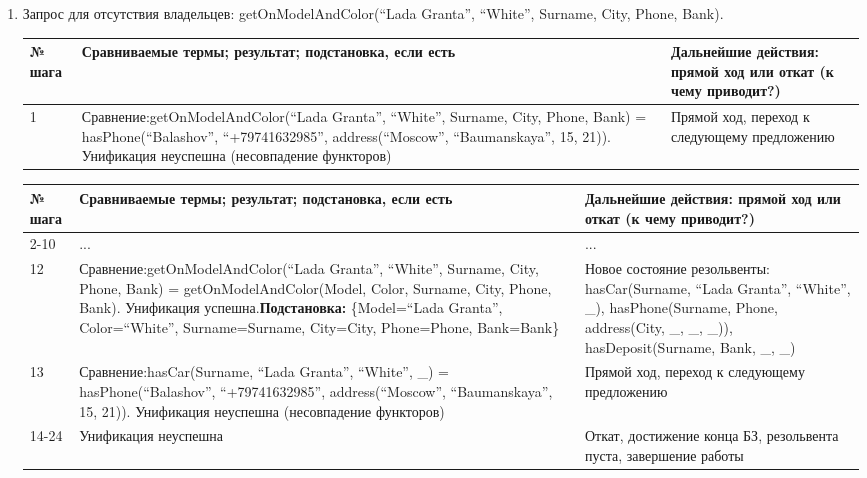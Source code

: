 \documentclass[14pt,a4paper]{scrreprt}
\begin{document}
\begin{enumerate}
	\item Запрос для отсутствия владельцев: getOnModelAndColor(``Lada Granta'', ``White'', Surname, City, Phone, Bank).

\begin{table}[H]
	\centering
	\begin{tabular}{|p{1.2cm\small}|p{9cm\small}|p{5cm\small}|}
		\hline
		№ шага & Сравниваемые термы; результат; подстановка, если есть & Дальнейшие действия: прямой ход или откат (к чему приводит?)\\
		\hline
		1 & Сравнение:\linebreak getOnModelAndColor(``Lada Granta'', ``White'', Surname, City, Phone, Bank) = hasPhone(``Balashov'', ``+79741632985'', address(``Moscow'', ``Baumanskaya'', 15, 21)). Унификация неуспешна (несовпадение функторов) & Прямой ход, переход к следующему предложению\\
		\hline
	\end{tabular}
\end{table}
		
\begin{table}[H]
	\centering
	\begin{tabular}{|p{1.2cm\small}|p{9cm\small}|p{5cm\small}|}
		\hline
		№ шага & Сравниваемые термы; результат; подстановка, если есть & Дальнейшие действия: прямой ход или откат (к чему приводит?)\\
		\hline	
		2-10 & ... & ...\\
		\hline
		12 & Сравнение:\linebreak getOnModelAndColor(``Lada Granta'', ``White'', Surname, City, Phone, Bank) = getOnModelAndColor(Model, Color, Surname, City, Phone, Bank). Унификация успешна.\linebreak \textbf{Подстановка:} \{Model=``Lada Granta'', Color=``White'', Surname=Surname, City=City, Phone=Phone, Bank=Bank\} & Новое состояние резольвенты: hasCar(Surname, ``Lada Granta'', ``White'', \_), hasPhone(Surname, Phone, address(City, \_, \_, \_)), hasDeposit(Surname, Bank, \_, \_)\\
		\hline 
		13 & Сравнение:\linebreak hasCar(Surname, ``Lada Granta'', ``White'', \_) = hasPhone(``Balashov'', ``+79741632985'', address(``Moscow'', ``Baumanskaya'', 15, 21)). Унификация неуспешна (несовпадение функторов) & Прямой ход, переход к следующему предложению\\
		\hline
		14-24 & Унификация неуспешна & Откат, достижение конца БЗ, резольвента пуста, завершение работы\\
		\hline 
	\end{tabular}
\end{table}


\end{enumerate}
\end{document}

